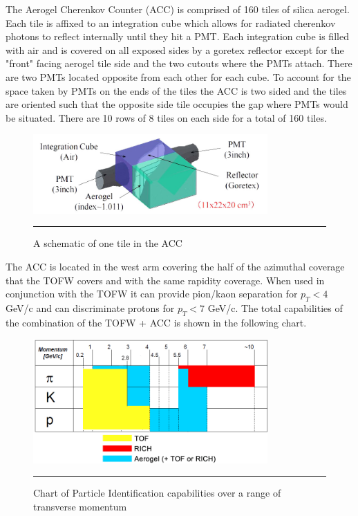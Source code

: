 The Aerogel Cherenkov Counter (ACC) is comprised of 160 tiles of silica aerogel. Each tile is affixed to an integration cube which allows for radiated cherenkov photons to reflect internally until they hit a PMT. Each integration cube is filled with air and is covered on all exposed sides by a goretex reflector except for the "front" facing aerogel tile side and the two cutouts where the PMTs attach. There are two PMTs located opposite from each other for each cube. To account for the space taken by PMTs on the ends of the tiles the ACC is two sided and the tiles are oriented such that the opposite side tile occupies the gap where PMTs would be situated.  There are 10 rows of 8 tiles on each side for a total of 160 tiles.

\begin{figure}[htbp!]
  \centering
    \includegraphics[width=0.8\textwidth]{Figures/aerogelchannel.JPG}
    \rule{35em}{0.5pt}
  \caption[A schematic of one tile in the ACC]{A schematic of one tile in the ACC}
  \label{fig:accchannel}
\end{figure}

The ACC is located in the west arm covering the half of the azimuthal coverage that the TOFW covers and with the same rapidity coverage. When used in conjunction with the TOFW it can provide pion/kaon separation for $p_{T} < 4$ GeV/c and can discriminate protons for $p_{T} < 7$ GeV/c.  The total capabilities of the combination of the TOFW + ACC is shown in the following chart.

\begin{figure}[h!]
  \centering
    \includegraphics[width=0.8\textwidth]{Figures/accrange.jpg}
    \rule{35em}{0.5pt}
  \caption[Chart of Particle Identification capabilities over a range of transverse momentum]{Chart of Particle Identification capabilities over a range of transverse momentum}
  \label{fig:PIDrange}
\end{figure}

